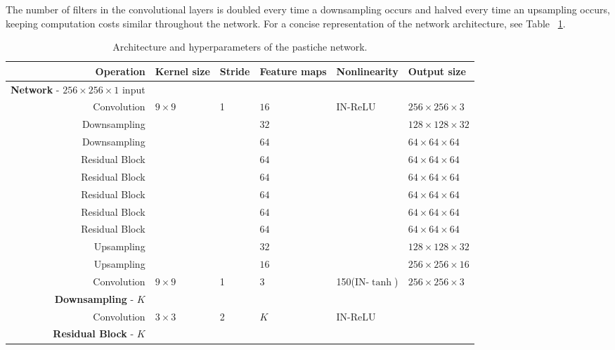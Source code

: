 The number of filters in the convolutional layers is doubled every time a downsampling occurs and halved every time an upsampling occurs, keeping computation costs similar throughout the network. For a concise representation of the network architecture, see Table ~\ref{tab:fast-arch}.

\begin{table}
	\centering
	\caption{Architecture and hyperparameters of the pastiche network.\label{tab:fast-arch}}
	\begin{adjustbox}{max width=\textwidth}
		\begin{tabular}{rlllll}
			\hline
			Operation                                        & Kernel size & Stride & Feature maps & Nonlinearity & Output size \\ \hline
			\textbf{Network} - $256\times 256\times 1$ input &             &        &              &         &              \\
			Convolution                                      & $9\times 9$ & 1      & $16$           & IN-ReLU & $256\times 256\times 3$\\
			Downsampling                                  &  &       & $32$             &         & $128\times128\times32$\\
			Downsampling                                  &  &   & $64$            &         & $64\times64\times64$\\
			Residual Block &  &       & $64$ &     & $64\times64\times64$\\
			Residual Block &  &       & $64$ &     & $64\times64\times64$\\
			Residual Block &  &       & $64$ &     & $64\times64\times64$\\
			Residual Block &  &       & $64$ &     & $64\times64\times64$\\
			Residual Block &  &       & $64$ &     & $64\times64\times64$\\
			Upsampling &  &  & $32$ &  & $128\times128\times32$\\
			Upsampling &  &  & $16$ &  & $256\times256\times16$\\
			Convolution                                      & $9\times 9$ & 1      & 3           & 150(IN-$\tanh$) & $256\times256\times3$\\
			\textbf{Downsampling} - $K$ & & & & &\\
			Convolution & $3\times 3$ & 2 & $K$ & IN-ReLU & \\
			\textbf{Residual Block} - $K$ & & & & &\\

\end{tabular}
\end{adjustbox}
\end{table}
